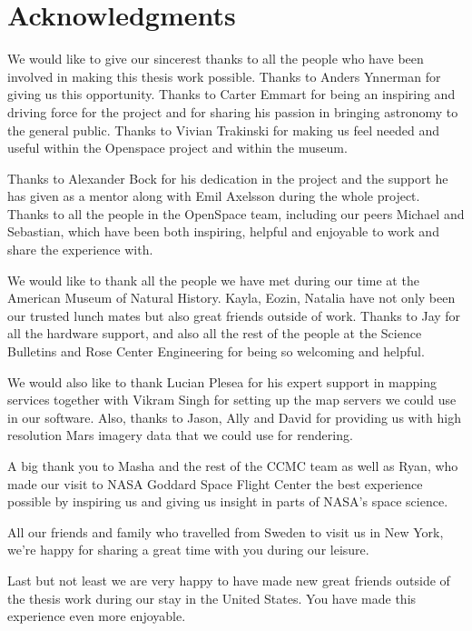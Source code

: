 \cleardoublepage
{}
{}
\chapter*{Acknowledgments}

We would like to give our sincerest thanks to all the people who have been involved in making this thesis work possible. Thanks to Anders Ynnerman for giving us this opportunity. Thanks to Carter Emmart for being an inspiring and driving force for the project and for sharing his passion in bringing astronomy to the general public. Thanks to Vivian Trakinski for making us feel needed and useful within the Openspace project and within the museum.

Thanks to Alexander Bock for his dedication in the project and the support he has given as a mentor along with Emil Axelsson during the whole project. Thanks to all the people in the OpenSpace team, including our peers Michael and Sebastian, which have been both inspiring, helpful and enjoyable to work and share the experience with.

We would like to thank all the people we have met during our time at the American Museum of Natural History. Kayla, Eozin, Natalia have not only been our trusted lunch mates but also great friends outside of work.
Thanks to Jay for all the hardware support, and also all the rest of the people at the Science Bulletins and Rose Center Engineering for being so welcoming and helpful.

We would also like to thank Lucian Plesea for his expert support in mapping services together with Vikram Singh for setting up the map servers we could use in our software. Also, thanks to Jason, Ally and David for providing us with high resolution Mars imagery data that we could use for rendering.

A big thank you to Masha and the rest of the CCMC team as well as Ryan, who made our visit to NASA Goddard Space Flight Center the best experience possible by inspiring us and giving us insight in parts of NASA's space science.

All our friends and family who travelled from Sweden to visit us in New York, we're happy for sharing a great time with you during our leisure. 

Last but not least we are very happy to have made new great friends outside of the thesis work during our stay in the United States. You have made this experience even more enjoyable.

\newpage
